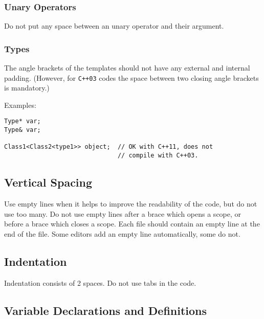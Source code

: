 \subsubsection{Unary Operators}

Do not put any space between an unary operator and their argument.

\subsubsection{Types}

The angle brackets of the templates should not have any external and internal padding.
(However, for \texttt{C++03} codes the space between two closing angle brackets is mandatory.)

Examples:
\begin{lstlisting}
Type* var;
Type& var;

Class1<Class2<type1>> object;  // OK with C++11, does not
                               // compile with C++03.
\end{lstlisting}

\subsection{Vertical Spacing}

Use empty lines when it helps to improve the readability of the code, but do not use too many.
Do not use empty lines after a brace which opens a scope,
or before a brace which closes a scope.
Each file should contain an empty line at the end of the file.
Some editors add an empty line automatically, some do not.

\subsection{Indentation}

Indentation consists of 2 spaces.
Do not use tabs in the code.

\subsection{Variable Declarations and Definitions}

